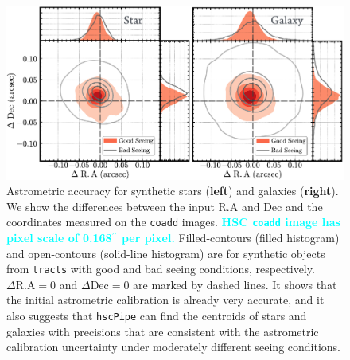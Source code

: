 \documentclass[useamsfonts]{pasj01}
\def\asec{$^{\prime\prime}$}
\def\hscpipe{\texttt{hscPipe}}
\def\coadd{\texttt{coadd}}
\def\tracts{\texttt{tracts}}
\newcommand{\song}[1]{\textcolor{cyan} {\textbf{#1}}}
\begin{document}
\begin{figure}
    \begin{center}
        \includegraphics[width=\textwidth]{fig/synpipe_astrometry}
    \end{center}
    \caption{
        Astrometric accuracy for synthetic stars (\textbf{left}) and galaxies
        (\textbf{right}). 
        We show the differences between the input R.A and Dec and the coordinates 
        measured on the \coadd{} images. 
        \song{
        HSC \coadd{} image has pixel scale of 0.168\asec{} per pixel. 
        }
        Filled-contours (filled histogram) and open-contours (solid-line histogram) are 
        for synthetic objects from \tracts{} with good and bad seeing conditions, 
        respectively.
        $\Delta\mathrm{R.A}=0$ and $\Delta\mathrm{Dec}=0$ are marked by dashed lines.     
        It shows that the initial astrometric calibration is already very accurate,  
        and it also suggests that \hscpipe{} can find the centroids of stars and 
        galaxies with precisions that are consistent with the astrometric calibration
        uncertainty under moderately different seeing conditions.
        }
    \label{fig:astrometry}
\end{figure}
\end{document}
